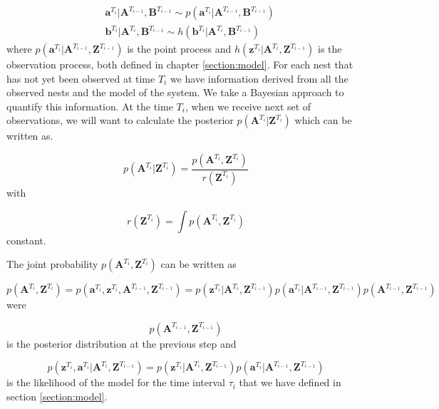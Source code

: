 \documentclass[11pt,a4paper]{article}
\renewcommand{\vec}[1]{\mathbf{#1}}
\begin{document}
{{\begin{align*}
   & \vec{a}^{T_i} | \vec{A}^{T_{i-1}}, \vec{B}^{T_{i-1}} \sim p(\vec{a}^{T_i} | \vec{A}^{T_{i-1}}, \vec{B}^{T_{i-1}}) \\
   & \vec{b}^{T_i} | \vec{A}^{T_i}, \vec{B}^{T_{i-1}} \sim h(\vec{b}^{T_i} | \vec{A}^{T_i}, \vec{B}^{T_{i-1}})
\end{align*}
where $p(\vec{a}^{T_i} | \vec{A}^{T_{i-1}}, \vec{Z}^{T_{i-1}})$ is the point process and $h(\vec{z}^{T_i} | \vec{A}^{T_i}, \vec{Z}^{T_{i-1}})$ is the observation process, both defined in chapter \ref{section:model}.
For each nest that has not yet been observed at time $T_i$ we have information derived from all the observed nests and the model of the system. We take a Bayesian approach to quantify this information. At the time $T_i$, when we receive next set of observations, we will want to calculate the posterior $p(\vec{A}^{T_i} | \vec{Z}^{T_i})$ which can be written as.

\begin{equation} \label{eq:post}
    p(\vec{A}^{T_i} | \vec{Z}^{T_i}) = \frac{p(\vec{A}^{T_i}, \vec{Z}^{T_{i}}) }{r(\vec{Z}^{T_{i}})}
\end{equation}
with

\begin{equation*}
    r(\vec{Z}^{T_i}) = \int p(\vec{A}^{T_i}, \vec{Z}^{T_i})
\end{equation*}
constant.

The joint probability $p(\vec{A}^{T_i}, \vec{Z}^{T_{i}})$ can be written as

\begin{equation} \label{eq:prior}
    p(\vec{A}^{T_i}, \vec{Z}^{T_{i}}) = p(\vec{a}^{T_i}, \vec{z}^{T_i}, \vec{A}^{T_{i-1}}, \vec{Z}^{T_{i-1}}) = p(\vec{z}^{T_i} | \vec{A}^{T_i}, \vec{Z}^{T_{i-1}}) p(\vec{a}^{T_i} | \vec{A}^{T_{i-1}}, \vec{Z}^{T_{i-1}}) p(\vec{A}^{T_{i-1}}, \vec{Z}^{T_{i-1}})
\end{equation}
were 

\begin{equation*}
    p(\vec{A}^{T_{i-1}}, \vec{Z}^{T_{i-1}})
\end{equation*}
is the posterior distribution at the previous step and 

\begin{equation*}
    p(\vec{z}^{T_i}, \vec{a}^{T_i} | \vec{A}^{T_i}, \vec{Z}^{T_{i-1}}) = p(\vec{z}^{T_i} | \vec{A}^{T_i}, \vec{Z}^{T_{i-1}}) p(\vec{a}^{T_i} | \vec{A}^{T_{i-1}}, \vec{Z}^{T_{i-1}})
\end{equation*} 
is the likelihood of the model for the time interval $\tau_i$ that we have defined in section \ref{section:model}.

}}
\end{document}
